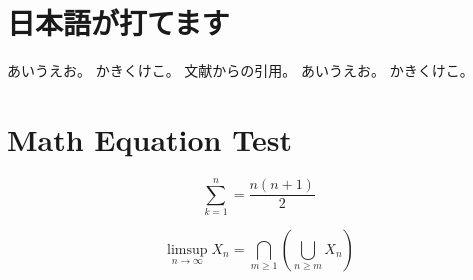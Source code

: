 \documentclass[pdflatex,ja=standard]{bxjsarticle}
\begin{document}
\section{日本語が打てます}
あいうえお。
かきくけこ。
文献からの引用\cite{9999999999}。\newline
あいうえお。
かきくけこ。

\section{Math Equation Test}

$$ \sum^{n}_{k=1} = \frac{n(n+1)}{2} $$

$$
    \limsup_{n \to \infty} X_n
        = \bigcap_{m \ge 1} \left(
            \bigcup_{n \ge m} X_n
        \right)
$$





\end{document}
